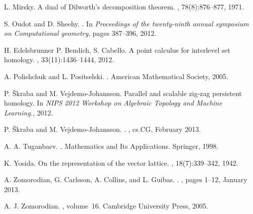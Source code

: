 \documentclass[10pt]{amsart}
\begin{document}
\begin{thebibliography}{10}
L. Mirsky.
\newblock A dual of Dilworth's decomposition theorem.
, 78(8):876--877, 1971.

S. Oudot and D. Sheehy.
.
\newblock In {\em Proceedings of the twenty-ninth annual symposium on
  Computational geometry}, pages 387--396, 2012.

H. Edelsbrunner P. Bendich, S. Cabello.
\newblock A point calculus for interlevel set homology.
, 33(11):1436--1444, 2012.

A. Polishchuk and L. Positselski.
.
\newblock American Mathematical Society, 2005.

P. {\v S}kraba and M. Vejdemo-Johansson.
\newblock Parallel and scalable zig-zag persistent homology.
\newblock In {\em NIPS 2012 Workshop on Algebraic Topology and Machine
  Learning.}, 2012.

P. {\v S}kraba and M. Vejdemo-Johansson.
.
, cs.CG, February 2013.

A. A. Tuganbaev.
.
\newblock Mathematics and Its Applications. Springer, 1998.

K. Yosida.
\newblock On the representation of the vector lattice.
, 18(7):339--342, 1942.

A. Zomorodian, G. Carlsson, A. Collins, and L. Guibas.
.
, pages 1--12,
  January 2013.

A. J. Zomorodian.
, volume~16.
\newblock Cambridge University Press, 2005.

\end{thebibliography}



\end{document}
